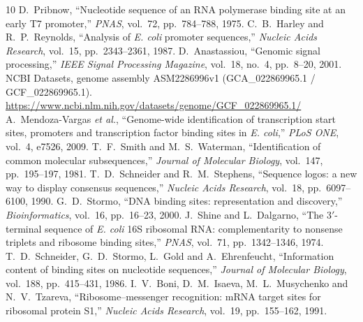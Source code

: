 \documentclass[11pt,a4paper]{article}
\begin{document}
\begin{thebibliography}{10}
\small
{} D.~Pribnow, ``Nucleotide sequence of an RNA polymerase binding site at an early T7
promoter,'' \textit{PNAS}, vol.~72, pp.~784--788, 1975.
 C.~B.~Harley and R.~P.~Reynolds, ``Analysis of \textit{E. coli} promoter
sequences,'' \textit{Nucleic Acids Research}, vol.~15, pp.~2343--2361, 1987.
 D.~Anastassiou, ``Genomic signal processing,'' \textit{IEEE Signal Processing
Magazine}, vol.~18, no.~4, pp.~8--20, 2001.
 NCBI Datasets, genome assembly ASM2286996v1 (GCA\_022869965.1 / GCF\_022869965.1).
\url{https://www.ncbi.nlm.nih.gov/datasets/genome/GCF_022869965.1/}
 A.~Mendoza-Vargas \textit{et al.}, ``Genome-wide identification of transcription
start sites, promoters and transcription factor binding sites in \textit{E. coli},''
\textit{PLoS ONE}, vol.~4, e7526, 2009.
 T.~F.~Smith and M.~S.~Waterman, ``Identification of common molecular subsequences,''
\textit{Journal of Molecular Biology}, vol.~147, pp.~195--197, 1981.
 T.~D.~Schneider and R.~M.~Stephens, ``Sequence logos: a new way to display consensus
sequences,'' \textit{Nucleic Acids Research}, vol.~18, pp.~6097--6100, 1990.
 G.~D.~Stormo, ``DNA binding sites: representation and discovery,''
\textit{Bioinformatics}, vol.~16, pp.~16--23, 2000.
 J.~Shine and L.~Dalgarno, ``The 3$'$-terminal sequence of \textit{E. coli} 16S
ribosomal RNA: complementarity to nonsense triplets and ribosome binding sites,'' \textit{PNAS},
vol.~71, pp.~1342--1346, 1974.
 T.~D.~Schneider, G.~D.~Stormo, L.~Gold and A.~Ehrenfeucht, ``Information content
of binding sites on nucleotide sequences,'' \textit{Journal of Molecular Biology}, vol.~188,
pp.~415--431, 1986.
 I.~V.~Boni, D.~M.~Isaeva, M.~L.~Musychenko and N.~V.~Tzareva, ``Ribosome--messenger
recognition: mRNA target sites for ribosomal protein S1,'' \textit{Nucleic Acids Research}, vol.~19,
pp.~155--162, 1991.
\end{thebibliography}

\appendix
\end{document}
